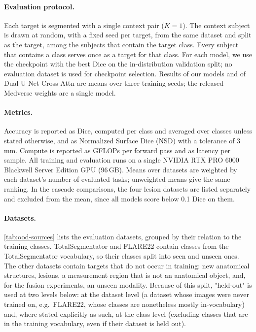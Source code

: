 \paragraph{Evaluation protocol.}
Each target is segmented with a single context pair ($K = 1$). The context
subject is drawn at random, with a fixed seed per target, from the same dataset
and split as the target, among the subjects that contain the target class.
Every subject that contains a class serves once as a target for that class. For each model, we use the checkpoint with the best
Dice on the in-distribution validation split; no evaluation dataset is used for
checkpoint selection. Results of our models and of Dual U-Net Cross-Attn are means over three
training seeds; the released Medverse weights are a single model.

\paragraph{Metrics.}
Accuracy is reported as Dice, computed per class and averaged over classes
unless stated otherwise, and as Normalized Surface Dice (NSD) with a tolerance
of 3\,mm. Compute is reported as GFLOPs per forward pass and as latency per
sample. All training and evaluation runs on a single NVIDIA
RTX PRO 6000 Blackwell Server Edition GPU (96\,GB). Means over datasets are weighted by each dataset's number of evaluated tasks;
unweighted means give the same ranking. In the cascade comparisons, the four
lesion datasets are listed separately and excluded from the mean, since all
models score below 0.1 Dice on them.


\paragraph{Datasets.}
\autoref{tab:ood-sources} lists the evaluation datasets, grouped by their
relation to the training classes. TotalSegmentator and FLARE22 contain classes
from the TotalSegmentator vocabulary, so their classes split into seen and
unseen ones. The other datasets contain targets that do not occur in training:
new anatomical structures, lesions, a measurement region that is not an
anatomical object, and, for the fusion experiments, an unseen modality.
Because of this split, "held-out" is used at two levels below: at the
dataset level (a dataset whose images were never trained on, e.g.\ FLARE22,
whose classes are nonetheless mostly in-vocabulary) and, where stated
explicitly as such, at the class level (excluding classes that are in the
training vocabulary, even if their dataset is held out).

